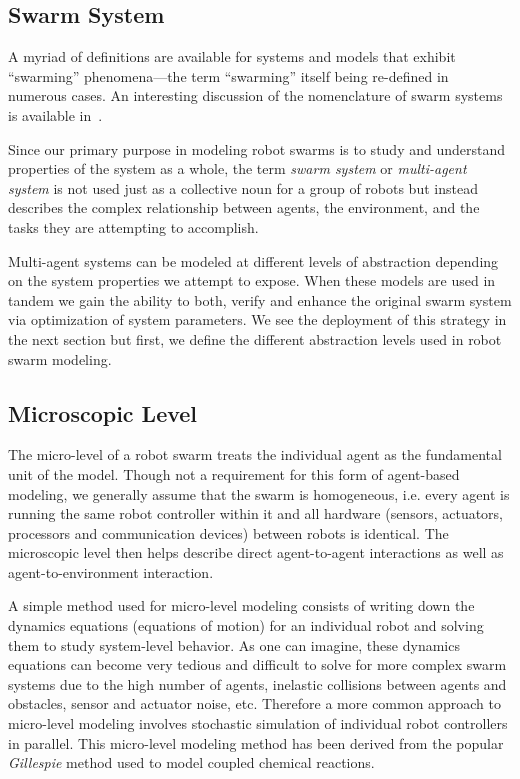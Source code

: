 \documentclass[Main.tex]{subfiles}
\begin{document}
\subsection{Swarm System}
A myriad of definitions are available for systems and models that exhibit ``swarming'' phenomena---the term ``swarming'' itself being re-defined in numerous cases. An interesting discussion of the nomenclature of swarm systems is available in~\cite{Beni2005, Beni2005a}.

Since our primary purpose in modeling robot swarms is to study and understand properties of the system as a whole, the term \emph{swarm system} or \emph{multi-agent system} is not used just as a collective noun for a group of robots but instead describes the complex relationship between agents, the environment, and the tasks they are attempting to accomplish.

Multi-agent systems can be modeled at different levels of abstraction depending on the system properties we attempt to expose. When these models are used in tandem we gain the ability to both, verify and enhance the original swarm system via optimization of system parameters. We see the deployment of this strategy in the next section but first, we define the different abstraction levels used in robot swarm modeling.


\subsection{Microscopic Level}
The micro-level of a robot swarm treats the individual agent as the fundamental unit of the model\cite{Lerman2001a}. Though not a requirement for this form of agent-based modeling, we generally assume that the swarm is homogeneous, i.e. every agent is running the same robot controller within it and all hardware (sensors, actuators, processors and communication devices) between robots is identical. The microscopic level then helps describe direct agent-to-agent interactions as well as agent-to-environment interaction. 

A simple method used for micro-level modeling consists of writing down the dynamics equations (equations of motion) for an individual robot and solving them to study system-level behavior. As one can imagine, these dynamics equations can become very tedious and difficult to solve for more complex swarm systems due to the high number of agents, inelastic collisions between agents and obstacles, sensor and actuator noise, etc. Therefore a more common approach to micro-level modeling involves stochastic simulation of individual robot controllers in parallel. This micro-level modeling method has been derived from the popular \emph{Gillespie} method\cite{Gillespie1976, Gillespie1977} used to model coupled chemical reactions.
\end{document}
